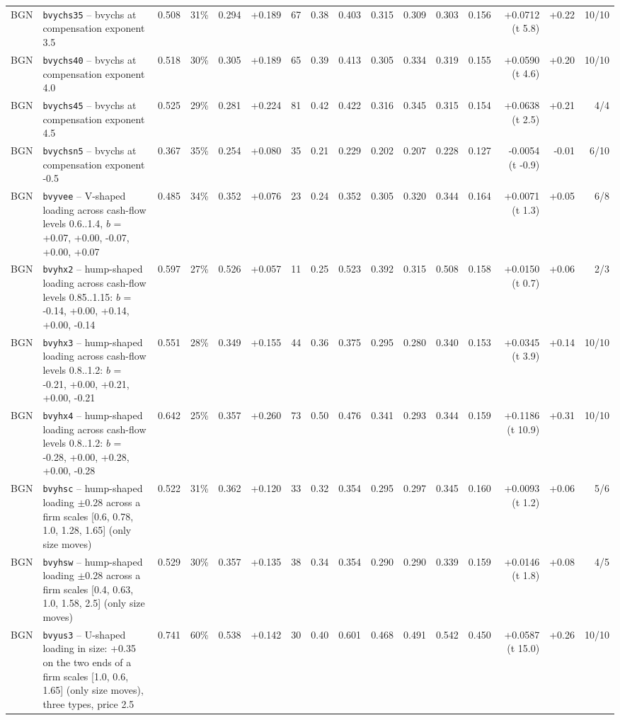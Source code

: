 \begin{landscape}
\begin{longtable}{lp{4.6cm}rrrrrrrrrrrrrr}
BGN & \texttt{bvychs35} -- bvychs at compensation exponent 3.5 & 0.508 & 31\% & 0.294 & +0.189 & 67 & 0.38 & 0.403 & 0.315 & 0.309 & 0.303 & 0.156 & +0.0712 (t 5.8) & +0.22 & 10/10 \\
BGN & \texttt{bvychs40} -- bvychs at compensation exponent 4.0 & 0.518 & 30\% & 0.305 & +0.189 & 65 & 0.39 & 0.413 & 0.305 & 0.334 & 0.319 & 0.155 & +0.0590 (t 4.6) & +0.20 & 10/10 \\
BGN & \texttt{bvychs45} -- bvychs at compensation exponent 4.5 & 0.525 & 29\% & 0.281 & +0.224 & 81 & 0.42 & 0.422 & 0.316 & 0.345 & 0.315 & 0.154 & +0.0638 (t 2.5) & +0.21 & 4/4 \\
BGN & \texttt{bvychsn5} -- bvychs at compensation exponent -0.5 & 0.367 & 35\% & 0.254 & +0.080 & 35 & 0.21 & 0.229 & 0.202 & 0.207 & 0.228 & 0.127 & -0.0054 (t -0.9) & -0.01 & 6/10 \\
BGN & \texttt{bvyvee} -- V-shaped loading across cash-flow levels 0.6..1.4, $b$ = +0.07, +0.00, -0.07, +0.00, +0.07 & 0.485 & 34\% & 0.352 & +0.076 & 23 & 0.24 & 0.352 & 0.305 & 0.320 & 0.344 & 0.164 & +0.0071 (t 1.3) & +0.05 & 6/8 \\
BGN & \texttt{bvyhx2} -- hump-shaped loading across cash-flow levels 0.85..1.15: $b$ = -0.14, +0.00, +0.14, +0.00, -0.14 & 0.597 & 27\% & 0.526 & +0.057 & 11 & 0.25 & 0.523 & 0.392 & 0.315 & 0.508 & 0.158 & +0.0150 (t 0.7) & +0.06 & 2/3 \\
BGN & \texttt{bvyhx3} -- hump-shaped loading across cash-flow levels 0.8..1.2: $b$ = -0.21, +0.00, +0.21, +0.00, -0.21 & 0.551 & 28\% & 0.349 & +0.155 & 44 & 0.36 & 0.375 & 0.295 & 0.280 & 0.340 & 0.153 & +0.0345 (t 3.9) & +0.14 & 10/10 \\
BGN & \texttt{bvyhx4} -- hump-shaped loading across cash-flow levels 0.8..1.2: $b$ = -0.28, +0.00, +0.28, +0.00, -0.28 & 0.642 & 25\% & 0.357 & +0.260 & 73 & 0.50 & 0.476 & 0.341 & 0.293 & 0.344 & 0.159 & +0.1186 (t 10.9) & +0.31 & 10/10 \\
BGN & \texttt{bvyhsc} -- hump-shaped loading $\pm$0.28 across a firm scales [0.6, 0.78, 1.0, 1.28, 1.65] (only size moves) & 0.522 & 31\% & 0.362 & +0.120 & 33 & 0.32 & 0.354 & 0.295 & 0.297 & 0.345 & 0.160 & +0.0093 (t 1.2) & +0.06 & 5/6 \\
BGN & \texttt{bvyhsw} -- hump-shaped loading $\pm$0.28 across a firm scales [0.4, 0.63, 1.0, 1.58, 2.5] (only size moves) & 0.529 & 30\% & 0.357 & +0.135 & 38 & 0.34 & 0.354 & 0.290 & 0.290 & 0.339 & 0.159 & +0.0146 (t 1.8) & +0.08 & 4/5 \\
BGN & \texttt{bvyus3} -- U-shaped loading in size: +0.35 on the two ends of a firm scales [1.0, 0.6, 1.65] (only size moves), three types, price 2.5 & 0.741 & 60\% & 0.538 & +0.142 & 30 & 0.40 & 0.601 & 0.468 & 0.491 & 0.542 & 0.450 & +0.0587 (t 15.0) & +0.26 & 10/10 \\

\end{longtable}
\end{landscape}
